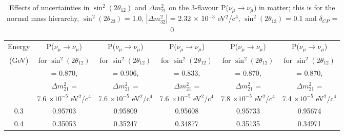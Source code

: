 
\begin{table}
\caption[Effects of uncertainties in $\sin^{2}(2 \theta_{12})$ and $\Delta m_{21}^{2}$ on the 3-flavour
P($\nu_{\mu} \rightarrow \nu_{\mu}$) in matter]{Effects of uncertainties in $\sin^{2}(2 \theta_{12})$ and $\Delta m_{21}^{2}$ 
on the 3-flavour P($\nu_{\mu} \rightarrow \nu_{\mu}$) in matter; this is for the normal mass hierarchy, $\sin^{2}(2 \theta_{23})$ 
= 1.0, $|\Delta m_{32}^{2}|$ = 2.32 $\times$ 10$^{-3}$ eV$^{2}$/c$^{4}$, $\sin^{2}(2 \theta_{13})$ = 0.1 and $\delta_{CP}$ = 0}
\centering
\begin{tabular}{| c | c | c | c | c | c |}
\hline
Energy & P($\nu_{\mu} \rightarrow \nu_{\mu}$) & P($\nu_{\mu} \rightarrow \nu_{\mu}$) &
       P($\nu_{\mu} \rightarrow \nu_{\mu}$) & P($\nu_{\mu} \rightarrow \nu_{\mu}$) & P($\nu_{\mu} \rightarrow \nu_{\mu}$) \\
(GeV) & for $\sin^{2}(2 \theta_{12})$ & for $\sin^{2}(2 \theta_{12})$ & for $\sin^{2}(2 \theta_{12})$
             & for $\sin^{2}(2 \theta_{12})$ & for $\sin^{2}(2 \theta_{12})$ \\
  & = 0.870, & = 0.906, & = 0.833, & = 0.870, & = 0.870, \\
  & $\Delta m_{21}^{2}$ = &  $\Delta m_{21}^{2}$ = & $\Delta m_{21}^{2}$ = & $\Delta m_{21}^{2}$ = & $\Delta m_{21}^{2}$ = \\
  & 7.6 $\times 10^{-5}$  eV$^{2}$/c$^{4}$ & 7.6 $\times 10^{-5}$  eV$^{2}$/c$^{4}$ & 7.6 $\times 10^{-5}$  eV$^{2}$/c$^{4}$ 
   & 7.8 $\times 10^{-5}$ eV$^{2}$/c$^{4}$ & 7.4 $\times 10^{-5}$  eV$^{2}$/c$^{4}$ \\
\hline
0.3 &  0.95703 &  0.95809 &  0.95608 &  0.95733 &  0.95674 \\
\hline
0.4 &  0.35053 &  0.35247 &  0.34877 &  0.35135 &  0.34971 \\

\end{tabular}
\end{table}
